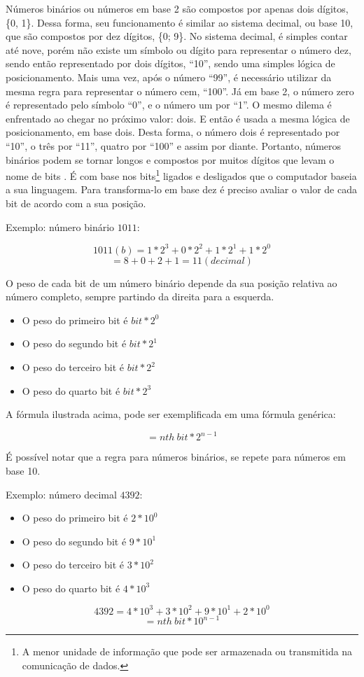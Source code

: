 Números binários ou números em base 2 são compostos por apenas dois dígitos, \{0, 1\}. Dessa forma, seu funcionamento é similar ao sistema decimal, ou base 10, que são compostos por dez dígitos, \{0; 9\}. No sistema decimal, é simples contar até nove, porém não existe um símbolo ou dígito para representar o número dez, sendo então representado por dois dígitos, ``10'', sendo uma simples lógica de posicionamento. Mais uma vez, após o número ``99'', é necessário utilizar da mesma regra para representar o número cem, ``100''. Já em base 2, o número zero é representado pelo símbolo ``0'', e o número um por ``1''. O mesmo dilema é enfrentado ao chegar no próximo valor: dois. E então é usada a mesma lógica de posicionamento, em base dois. Desta forma, o número dois é representado por ``10'', o três por ``11'', quatro por ``100'' e assim por diante. Portanto, números binários podem se tornar longos e compostos por muitos dígitos que levam o nome de bits \cite{6}. É com base nos \label{bits}bits\footnote{A menor unidade de informação que pode ser armazenada ou transmitida na comunicação de dados.} ligados e desligados que o computador baseia a sua linguagem. Para transforma-lo em base dez é preciso avaliar o valor de cada bit de acordo com a sua posição. 

Exemplo: número binário $1011$:

\[ 1011(b) = 1*2^3 + 0*2^2 + 1*2^1 + 1*2^0\]
\[ = 8 + 0 + 2 + 1 = 11(decimal)\]

O peso de cada bit de um número binário depende da sua posição relativa ao número completo, sempre partindo da direita para a esquerda.

\begin{itemize}
  \item O peso do primeiro bit é $bit * 2^0$
  \item O peso do segundo bit é $bit * 2^1$
  \item O peso do terceiro bit é $bit * 2^2$
  \item O peso do quarto bit é $bit * 2^3$
\end{itemize}

A fórmula ilustrada acima, pode ser exemplificada em uma fórmula genérica: 

\[= nth\: bit * 2^{n-1}\]

É possível notar que a regra para números binários, se repete para números em base 10.

Exemplo: número decimal $4392$:
\begin{itemize}
  \item O peso do primeiro bit é $2 * 10^0$
  \item O peso do segundo bit é $9 * 10^1$
  \item O peso do terceiro bit é $3 * 10^2$
  \item O peso do quarto bit é $4 * 10^3$
\end{itemize}
\[ 4392 = 4*10^3 + 3*10^2 + 9*10^1 + 2*10^0\]
\[= nth\: bit * 10^{n-1}\]

